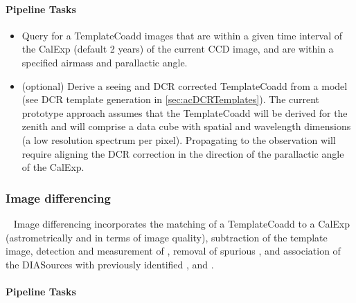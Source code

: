 \paragraph{Pipeline Tasks}

\begin{itemize}
\item Query for a TemplateCoadd images that are within a given time interval of the CalExp  (default 2 years) of the current CCD image, and are within a specified airmass and parallactic angle.
\item (optional) Derive a seeing and DCR corrected TemplateCoadd from a model (see DCR template generation in \ref{sec:acDCRTemplates}). The current prototype approach assumes that the TemplateCoadd  will be derived for the zenith and will comprise a data cube with spatial and wavelength dimensions (a low resolution spectrum per pixel). Propagating to the observation will require aligning the DCR correction in the direction of the parallactic angle of the CalExp.
\end{itemize}

\subsubsection{Image differencing}~
Image differencing incorporates the matching of a TemplateCoadd to a CalExp (astrometrically and in terms of image quality), subtraction of the template image, detection and measurement of \DIASources, removal of spurious \DIASources, and association of the DIASources with previously identified \DIAObjects, and \SSObjects. 

\paragraph{Pipeline Tasks}

